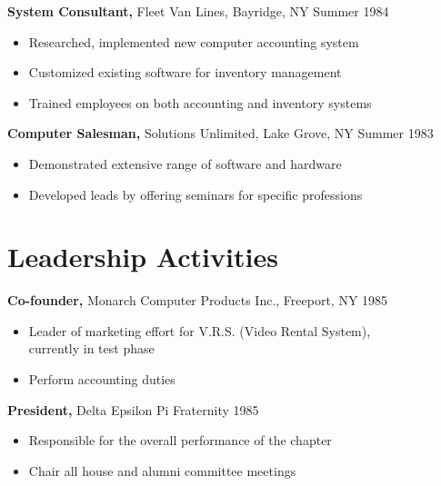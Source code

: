 \documentclass[margin]{res}
\begin{document}
\begin{resume}
 
 
{\bf System Consultant,} Fleet Van Lines, Bayridge, NY \hfill  Summer 1984
\begin{itemize} \itemsep -2pt %
\item Researched, implemented new computer accounting 
                 system 
\item Customized existing software for inventory 
                 management 
\item Trained employees on both accounting and inventory 
                 systems 
\end{itemize}

{\bf Computer Salesman,} Solutions Unlimited, Lake Grove, NY \hfill
Summer 1983                
                \begin{itemize} \itemsep -2pt
                 \item  Demonstrated extensive range of software and 
                 hardware 
                
                 \item Developed leads by offering seminars for specific 
                 professions 

		 \end{itemize}

\section{Leadership   Activities} 
               {\bf Co-founder,} Monarch Computer Products Inc., Freeport, NY    \hfill         1985 
                \begin{itemize} \itemsep -2pt
              \item Leader of marketing effort for V.R.S. (Video 
                 Rental System), \\
                  currently in test phase 
                 
                \item  Perform accounting duties 

		 \end{itemize}

		{\bf President,} Delta Epsilon Pi Fraternity \hfill   1985 
                \begin{itemize} \itemsep -2pt
                 \item  Responsible for the overall performance of the 
                 chapter 
                
                 \item Chair all house and alumni committee meetings 
                

\end{itemize}
\end{resume}
\end{document}
